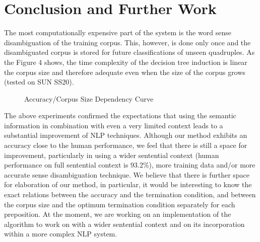 \section{Conclusion and Further Work}

The most computationally expensive part of the system is the word sense disambiguation of the training corpus. This, however, is done only once and the disambiguated corpus is stored for future classifications of unseen quadruples. As the Figure 4 shows, the time complexity of the decision tree induction is linear the corpus size and therefore adequate even when the size of the corpus grows (tested on SUN SS20).


\begin{figure}[t]
  \leavevmode
  \begin{center}
	
    \caption{Accuracy/Corpus Size Dependency Curve}
    \label{fig:4}
  \end{center}
\end{figure}


The above experiments confirmed the expectations that using the semantic information in combination with even a very limited context leads to a substantial improvement of NLP techniques. Although our method exhibits an accuracy close to the human performance, we feel that there is still a space for improvement, particularly in using a wider sentential context (human performance on full sentential context is 93.2\%), more training data and/or more accurate sense disambiguation technique. We believe that there is further space for elaboration of our method, in particular, it would be interesting to know the exact relations between the accuracy and the termination condition, and between the corpus size and the optimum termination condition separately for each preposition. At the moment, we are working on an implementation of the algorithm to work on with a wider sentential context and on its incorporation within a more complex NLP system.





